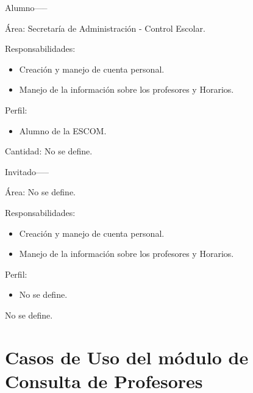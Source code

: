 \begin{actor}{Alumno}{-----}
	
	\item[Área:] Secretaría de Administración - Control Escolar.
	
	\item[Responsabilidades:] \hspace{1pt}
	\begin{itemize}
		\item Creación y manejo de cuenta personal.
		\item Manejo de la información sobre los profesores y Horarios.
		
	\end{itemize}
	\item[Perfil:] \hspace{1pt}
	\begin{itemize}
		\item Alumno de la ESCOM.
	\end{itemize}
	\item[Cantidad:] No se define.
\end{actor}



\begin{actor}{Invitado}{-----}
	
	\item[Área:] No se define.
	
	\item[Responsabilidades:] \hspace{1pt}
	
	\begin{itemize}
		\item Creación y manejo de cuenta personal.
		\item Manejo de la información sobre los profesores y Horarios.
	\end{itemize}
	\item[Perfil:] \hspace{1pt}
	\begin{itemize}
		\item No se define.
	\end{itemize}
		\item No se define.
\end{actor}




\section{Casos de Uso del módulo de Consulta de Profesores}

